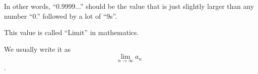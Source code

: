 \begin{frame}[c]{}{}
  In other words, ``0.9999...'' should be the value that is just slightly larger than any number ``0.'' followed by a lot of ``9s''.
\end{frame}

\begin{frame}[c]{}{}
  This value is called ``Limit'' in mathematics.

  \vspace{2ex}

  We usually write it as $$\lim_{n \to \infty} a_n$$.
\end{frame}
